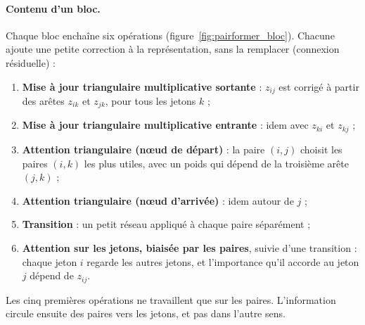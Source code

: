 \paragraph{Contenu d'un bloc.} Chaque bloc enchaîne six opérations (figure~\ref{fig:pairformer_bloc}). Chacune ajoute une petite correction à la représentation, sans la remplacer (connexion résiduelle) :
\begin{enumerate}
  \item \textbf{Mise à jour triangulaire multiplicative \og sortante \fg{}} : $z_{ij}$ est corrigé à partir des arêtes $z_{ik}$ et $z_{jk}$, pour tous les jetons $k$ ;
  \item \textbf{Mise à jour triangulaire multiplicative \og entrante \fg{}} : idem avec $z_{ki}$ et $z_{kj}$ ;
  \item \textbf{Attention triangulaire (nœud de départ)} : la paire $(i,j)$ choisit les paires $(i,k)$ les plus utiles, avec un poids qui dépend de la troisième arête $(j,k)$ ;
  \item \textbf{Attention triangulaire (nœud d'arrivée)} : idem autour de $j$ ;
  \item \textbf{Transition} : un petit réseau appliqué à chaque paire séparément ;
  \item \textbf{Attention sur les jetons, biaisée par les paires}, suivie d'une transition : chaque jeton $i$ regarde les autres jetons, et l'importance qu'il accorde au jeton $j$ dépend de $z_{ij}$.
\end{enumerate}
Les cinq premières opérations ne travaillent que sur les paires. L'information circule ensuite des paires vers les jetons, et pas dans l'autre sens.

